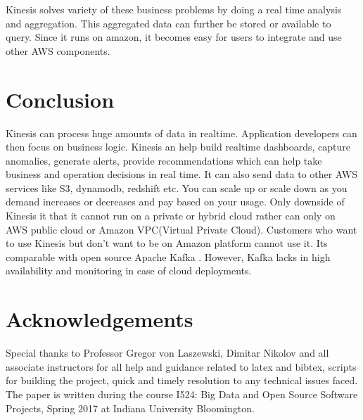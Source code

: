\documentclass[9pt,twocolumn,twoside]{styles/osajnl}
\begin{document}
Kinesis solves variety of these business problems by doing a real time analysis and aggregation. This aggregated data can further be stored or available to query. Since it runs on amazon, it becomes easy for users to integrate and use other AWS components.

\section{Conclusion}
Kinesis can process huge amounts of data in realtime. Application developers can then focus on business logic. Kinesis \cite{varia2014overview} an help build realtime dashboards, capture anomalies, generate alerts, provide recommendations which can help take business and operation decisions in real time. It can also send data to other AWS services like S3, dynamodb, redshift etc. You can scale up or scale down as you demand increases or decreases and pay based on your usage. Only downside of Kinesis it that it cannot run on a private or hybrid cloud rather can only on AWS public cloud or Amazon VPC(Virtual Private Cloud). Customers who want to use Kinesis but don't want to be on Amazon platform cannot use it. Its comparable with open source Apache Kafka\cite{deyhim2016kafka} . However, Kafka lacks in high availability and monitoring in case of cloud deployments. 

\section*{Acknowledgements}
Special thanks to Professor Gregor von Laszewski, Dimitar Nikolov and all associate instructors for all help and guidance related to latex and bibtex, scripts for building the project, quick and timely resolution to any technical issues faced. The paper is written during the course  {I524: Big Data and Open Source Software Projects, Spring 2017} at Indiana University Bloomington.

 
\medskip

% 

\end{document}

